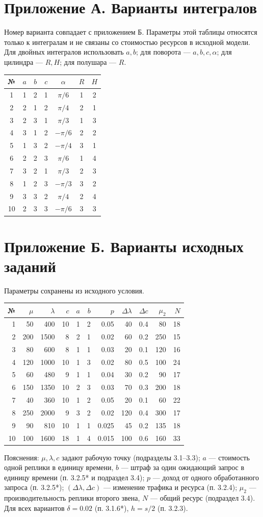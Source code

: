 \documentclass[12pt,a4paper]{article}
\begin{document}
\section*{Приложение А. Варианты интегралов}
Номер варианта совпадает с приложением Б. Параметры этой таблицы относятся
только к интегралам и не связаны со стоимостью ресурсов в исходной модели.
Для двойных интегралов использовать $a,b$; для поворота --- $a,b,c,\alpha$;
для цилиндра --- $R,H$; для полушара --- $R$.
\begin{center}
\begin{tabular}{c|ccc|c|cc}
№ & $a$ & $b$ & $c$ & $\alpha$ & $R$ & $H$\\\hline
1&1&2&1&$\pi/6$&1&2\\
2&2&1&2&$\pi/4$&2&1\\
3&2&3&1&$\pi/3$&1&3\\
4&3&1&2&$-\pi/6$&2&2\\
5&1&3&2&$-\pi/4$&3&1\\
6&2&2&3&$\pi/6$&1&4\\
7&3&2&1&$\pi/3$&2&3\\
8&1&2&3&$-\pi/3$&3&2\\
9&3&3&2&$\pi/4$&2&4\\
10&2&3&3&$-\pi/6$&3&3\\
\end{tabular}
\end{center}

\section*{Приложение Б. Варианты исходных заданий}
Параметры сохранены из исходного условия.
{\small
\begin{longtable}{r|rrrrrrrrrr}
№ & $\mu$ & $\lambda$ & $c$ & $a$ & $b$ & $p$ & $\Delta\lambda$ & $\Delta c$ & $\mu_2$ & $N$\\\hline
\endhead
1&50&400&10&1&2&0.05&40&0.4&80&18\\
2&200&1500&8&2&1&0.02&60&0.2&250&15\\
3&80&600&8&1&1&0.03&20&0.1&120&16\\
4&120&1000&10&1&3&0.02&80&0.5&100&24\\
5&60&480&9&1&1&0.04&30&0.2&90&17\\
6&150&1350&10&2&3&0.03&70&0.3&200&18\\
7&40&360&10&1&2&0.05&20&0.1&60&22\\
8&250&2000&9&3&2&0.02&120&0.4&300&17\\
9&90&810&10&1&1&0.025&45&0.2&135&18\\
10&100&1600&18&1&4&0.015&100&0.6&160&33\\
\end{longtable}}
Пояснения: $\mu,\lambda,c$ задают рабочую точку (подразделы 3.1--3.3);
$a$ --- стоимость одной реплики в единицу времени,
$b$ --- штраф за один ожидающий запрос в единицу времени (п. 3.2.5* и подраздел 3.4);
$p$ --- доход от одного обработанного запроса (п. 3.2.5*);
$(\Delta\lambda,\Delta c)$ --- изменение трафика и ресурса (п. 3.2.4);
$\mu_2$ --- производительность реплики второго звена, $N$ --- общий ресурс (подраздел 3.4).
Для всех вариантов $\delta=0.02$ (п. 3.1.6*), $h=s/2$ (п. 3.2.3).
\end{document}
